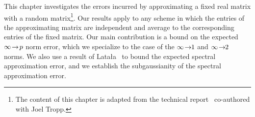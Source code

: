 This chapter investigates the errors incurred by approximating a fixed real matrix
with a random matrix\footnote{The content of this chapter is adapted from the 
technical report~\cite{GT11} co-authored with Joel Tropp.}. Our results apply to any 
scheme in which the entries of the approximating matrix are independent and average 
to the corresponding entries of the fixed matrix. Our main contribution is a bound 
on the expected $\infty\!\rightarrow\!p$ norm error, which we specialize to the case of the $\infty\!\rightarrow\!\!1$ 
and $\infty\!\rightarrow\!\!2$ norms. We also use a result of Lata{\l}a~\cite{Lat04} to bound
the expected spectral approximation error, and we establish the
subgaussianity of the spectral approximation error.

% 

% 
% 
% 
% 

